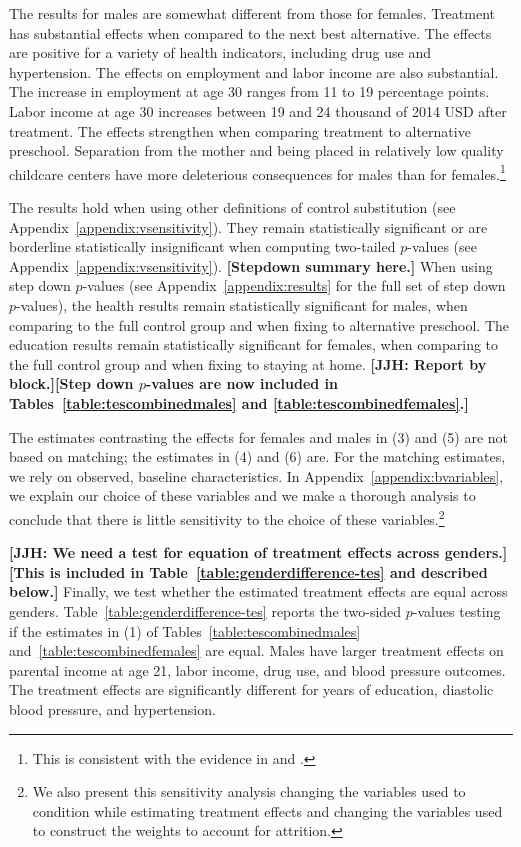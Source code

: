 The results for males are somewhat different from those for females. Treatment has substantial effects when compared to the next best alternative. The effects are positive for a variety of health indicators, including drug use and hypertension. The effects on employment and labor income are also substantial. The increase in employment at age 30 ranges from 11 to 19 percentage points. Labor income at age 30 increases between 19 and 24 thousand of 2014 USD after treatment. The effects strengthen when comparing treatment to alternative preschool. Separation from the mother and being placed in relatively low quality childcare centers have more deleterious consequences for males than for females.\footnote{This is consistent with the evidence in \citet{Baker_Gruber_Milligan_2015_Noncog_Defects} and \citet{Kottelenberg-Lehrer_2014_Gender-Effects}.}

The results hold when using other definitions of control substitution (see Appendix~\ref{appendix:vsensitivity}). They remain statistically significant or are borderline statistically insignificant when computing two-tailed $p$-values (see Appendix~\ref{appendix:vsensitivity}). \textbf{[Stepdown summary here.]} When using step down $p$-values (see Appendix~\ref{appendix:results} for the full set of step down $p$-values), the health results remain statistically significant for males, when comparing to the full control group and when fixing to alternative preschool. The education results remain statistically significant for females, when comparing to the full control group and when fixing to staying at home. \textbf{[JJH: Report by block.][Step down $p$-values are now included in Tables~\ref{table:tescombinedmales} and \ref{table:tescombinedfemales}.]} 

The estimates contrasting the effects for females and males in (3) and (5) are not based on matching; the estimates in (4) and (6) are. For the matching estimates, we rely on observed, baseline characteristics. In Appendix~\ref{appendix:bvariables}, we explain our choice of these variables and we make a thorough analysis to conclude that there is little sensitivity to the choice of these variables.\footnote{We also present this sensitivity analysis changing the variables used to condition while estimating treatment effects and changing the variables used to construct the weights to account for attrition.}

\textbf{[JJH: We need a test for equation of treatment effects across genders.][This is included in Table~\ref{table:genderdifference-tes} and described below.]}
Finally, we test whether the estimated treatment effects are equal across genders. Table~\ref{table:genderdifference-tes} reports the two-sided $p$-values testing if the estimates in (1) of Tables~\ref{table:tescombinedmales} and~\ref{table:tescombinedfemales} are equal. Males have larger treatment effects on parental income at age 21, labor income, drug use, and blood pressure outcomes. The treatment effects are significantly different for years of education, diastolic blood pressure, and hypertension. 

